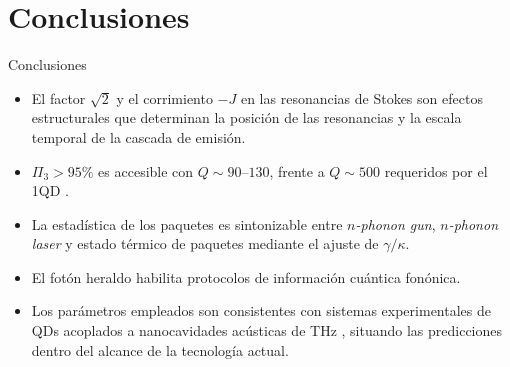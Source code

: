 \documentclass[
11pt,notheorems,hyperref={pdfauthor=whatever}
]{beamer}
\begin{document}
\section{Conclusiones}
\begin{frame}{Conclusiones}
	
	\begin{itemize}\setlength{\itemsep}{8pt}
		
		\item El factor  $\sqrt{2}$ y el corrimiento $-J$ en las
		resonancias de Stokes son efectos estructurales que determinan
		la posición de las resonancias y la escala temporal de la cascada
		de emisión.
		
		\item $\Pi_3 > 95\%$ es accesible con $Q \sim 90$--$130$, frente a
		$Q \sim 500$ requeridos por el 1QD \cite{bin2020}. 
		
		\item La estadística de los paquetes es sintonizable entre
		\textit{$n$-phonon gun}, \textit{$n$-phonon laser} y estado
		térmico de paquetes mediante el ajuste de $\gamma/\kappa$.
		
		\item El fotón heraldo habilita protocolos de información cuántica
		fonónica.
		
		\item Los parámetros empleados son consistentes con sistemas
		experimentales de QDs acoplados a nanocavidades acústicas de THz
		\cite{weig2004,rozas2009}, situando las predicciones dentro del
		alcance de la tecnología actual.
		
	\end{itemize}
	
\end{frame}

\end{document}
